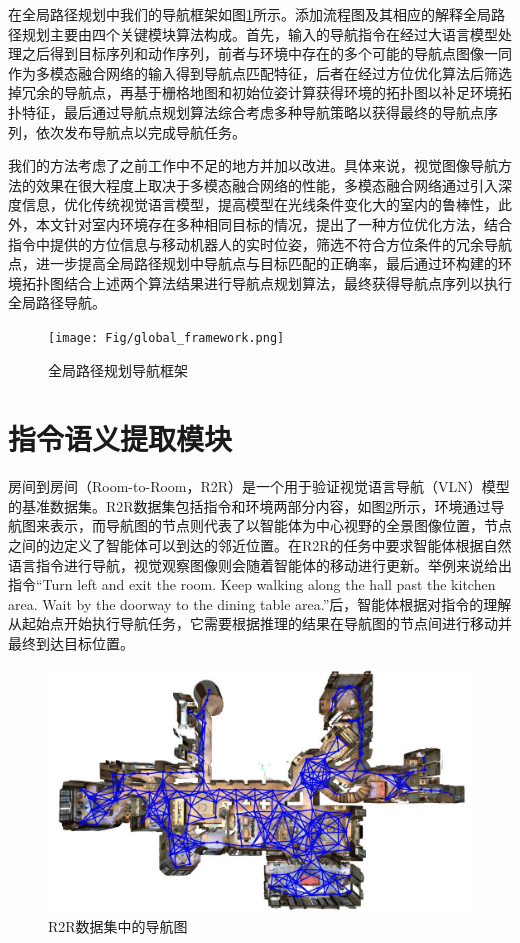 在全局路径规划中我们的导航框架如图\ref{global_framework}所示。$添加流程图及其相应的解释$全局路径规划主要由四个关键模块算法构成。首先，输入的导航指令在经过大语言模型处理之后得到目标序列和动作序列，前者与环境中存在的多个可能的导航点图像一同作为多模态融合网络的输入得到导航点匹配特征，后者在经过方位优化算法后筛选掉冗余的导航点，再基于栅格地图和初始位姿计算获得环境的拓扑图以补足环境拓扑特征，最后通过导航点规划算法综合考虑多种导航策略以获得最终的导航点序列，依次发布导航点以完成导航任务。

我们的方法考虑了之前工作中不足的地方并加以改进。具体来说，视觉图像导航方法的效果在很大程度上取决于多模态融合网络的性能，多模态融合网络通过引入深度信息，优化传统视觉语言模型，提高模型在光线条件变化大的室内的鲁棒性，此外，本文针对室内环境存在多种相同目标的情况，提出了一种方位优化方法，结合指令中提供的方位信息与移动机器人的实时位姿，筛选不符合方位条件的冗余导航点，进一步提高全局路径规划中导航点与目标匹配的正确率，最后通过环构建的环境拓扑图结合上述两个算法结果进行导航点规划算法，最终获得导航点序列以执行全局路径导航。
\begin{figure}[htbp]
    \centering
    \texttt{[image: Fig/global\_framework.png]}
    \caption{\label{global_framework}全局路径规划导航框架}
\end{figure}


\section{指令语义提取模块}
房间到房间（Room-to-Room，R2R）是一个用于验证视觉语言导航（VLN）模型的基准数据集\cite{anderson2018vision}。R2R数据集包括指令和环境两部分内容，如图\ref{r2r_nav}所示，环境通过导航图来表示，而导航图的节点则代表了以智能体为中心视野的全景图像位置，节点之间的边定义了智能体可以到达的邻近位置。在R2R的任务中要求智能体根据自然语言指令进行导航，视觉观察图像则会随着智能体的移动进行更新。举例来说给出指令“Turn left and exit the room. Keep walking along the hall past the kitchen area. Wait by the doorway to the dining table area.”后，智能体根据对指令的理解从起始点开始执行导航任务，它需要根据推理的结果在导航图的节点间进行移动并最终到达目标位置。
\begin{figure}[htbp]
    \centering
    \includegraphics[scale=0.55]{Fig/r2r_nav.png}
    \caption{\label{r2r_nav}R2R数据集中的导航图}
\end{figure}

